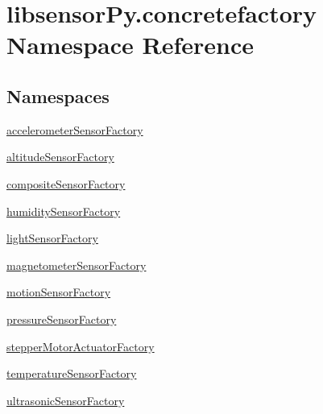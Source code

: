 \hypertarget{namespacelibsensorPy_1_1concretefactory}{}\section{libsensor\+Py.\+concretefactory Namespace Reference}
\label{namespacelibsensorPy_1_1concretefactory}
\subsection*{Namespaces}
\begin{DoxyCompactItemize}
\item 
 \hyperlink{namespacelibsensorPy_1_1concretefactory_1_1accelerometerSensorFactory}{accelerometer\+Sensor\+Factory}
\item 
 \hyperlink{namespacelibsensorPy_1_1concretefactory_1_1altitudeSensorFactory}{altitude\+Sensor\+Factory}
\item 
 \hyperlink{namespacelibsensorPy_1_1concretefactory_1_1compositeSensorFactory}{composite\+Sensor\+Factory}
\item 
 \hyperlink{namespacelibsensorPy_1_1concretefactory_1_1humiditySensorFactory}{humidity\+Sensor\+Factory}
\item 
 \hyperlink{namespacelibsensorPy_1_1concretefactory_1_1lightSensorFactory}{light\+Sensor\+Factory}
\item 
 \hyperlink{namespacelibsensorPy_1_1concretefactory_1_1magnetometerSensorFactory}{magnetometer\+Sensor\+Factory}
\item 
 \hyperlink{namespacelibsensorPy_1_1concretefactory_1_1motionSensorFactory}{motion\+Sensor\+Factory}
\item 
 \hyperlink{namespacelibsensorPy_1_1concretefactory_1_1pressureSensorFactory}{pressure\+Sensor\+Factory}
\item 
 \hyperlink{namespacelibsensorPy_1_1concretefactory_1_1stepperMotorActuatorFactory}{stepper\+Motor\+Actuator\+Factory}
\item 
 \hyperlink{namespacelibsensorPy_1_1concretefactory_1_1temperatureSensorFactory}{temperature\+Sensor\+Factory}
\item 
 \hyperlink{namespacelibsensorPy_1_1concretefactory_1_1ultrasonicSensorFactory}{ultrasonic\+Sensor\+Factory}
\end{DoxyCompactItemize}
